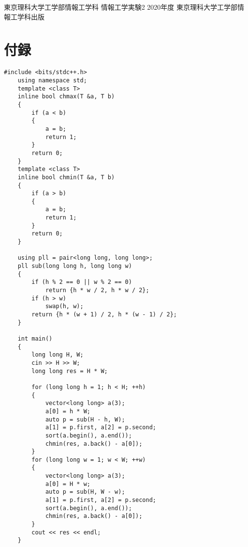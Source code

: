\documentclass[12pt]{jarticle}
\begin{document}
\clearpage

\begin{thebibliography}{99}
    \label{sannkoubunnkenn_chapter}
    東京理科大学工学部情報工学科 情報工学実験2 2020年度
    東京理科大学工学部情報工学科出版

\end{thebibliography}


\clearpage

\appendix
\section{付録}
\begin{lstlisting}[style = lstcpp,caption=saiteki.cpp]
    #include <bits/stdc++.h>
    using namespace std;
    template <class T>
    inline bool chmax(T &a, T b)
    {
        if (a < b)
        {
            a = b;
            return 1;
        }
        return 0;
    }
    template <class T>
    inline bool chmin(T &a, T b)
    {
        if (a > b)
        {
            a = b;
            return 1;
        }
        return 0;
    }
    
    using pll = pair<long long, long long>;
    pll sub(long long h, long long w)
    {
        if (h % 2 == 0 || w % 2 == 0)
            return {h * w / 2, h * w / 2};
        if (h > w)
            swap(h, w);
        return {h * (w + 1) / 2, h * (w - 1) / 2};
    }
    
    int main()
    {
        long long H, W;
        cin >> H >> W;
        long long res = H * W;
    
        for (long long h = 1; h < H; ++h)
        {
            vector<long long> a(3);
            a[0] = h * W;
            auto p = sub(H - h, W);
            a[1] = p.first, a[2] = p.second;
            sort(a.begin(), a.end());
            chmin(res, a.back() - a[0]);
        }
        for (long long w = 1; w < W; ++w)
        {
            vector<long long> a(3);
            a[0] = H * w;
            auto p = sub(H, W - w);
            a[1] = p.first, a[2] = p.second;
            sort(a.begin(), a.end());
            chmin(res, a.back() - a[0]);
        }
        cout << res << endl;
    }
\end{lstlisting}


\end{document}
